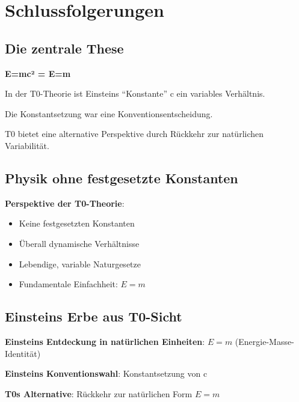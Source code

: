 	\section{Schlussfolgerungen}
	
	\subsection{Die zentrale These}
	
	\begin{tcolorbox}[colback=green!5!white,colframe=green!75!black,title=Zusammenfassung]
		\textbf{E=mc² = E=m}
		
		In der T0-Theorie ist Einsteins ``Konstante'' c ein variables Verhältnis.
		
		Die Konstantsetzung war eine Konventionsentscheidung.
		
		T0 bietet eine alternative Perspektive durch Rückkehr zur natürlichen Variabilität.
	\end{tcolorbox}
	
	\subsection{Physik ohne festgesetzte Konstanten}
	
	\textbf{Perspektive der T0-Theorie}:
	\begin{itemize}
		\item Keine festgesetzten Konstanten
		\item Überall dynamische Verhältnisse
		\item Lebendige, variable Naturgesetze
		\item Fundamentale Einfachheit: $E = m$
	\end{itemize}
	
	\subsection{Einsteins Erbe aus T0-Sicht}
	
	\textbf{Einsteins Entdeckung in natürlichen Einheiten}: $E = m$ (Energie-Masse-Identität)
	
	\textbf{Einsteins Konventionswahl}: Konstantsetzung von c
	
	\textbf{T0s Alternative}: Rückkehr zur natürlichen Form $E = m$
	

